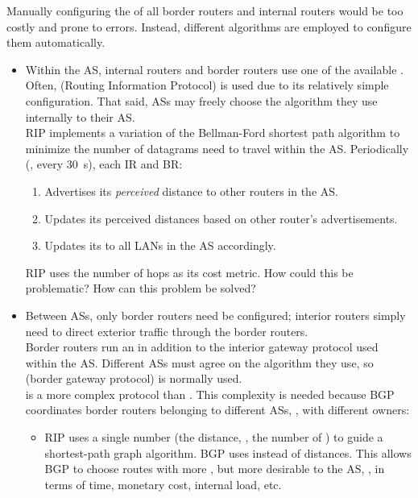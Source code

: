 Manually configuring the  of all border routers and internal routers
would be too costly and prone to errors. Instead, different algorithms are employed to configure them automatically.
\begin{itemize}
\item Within the AS, internal routers and border routers use one of the available 
.
Often,  (Routing Information Protocol) is used due to its relatively simple configuration.
That said, ASs may freely choose the algorithm they use internally to their AS.\\[-0.2cm]

RIP implements a variation of the Bellman-Ford shortest path algorithm to minimize the number of 
datagrams need to travel within the AS. Periodically (\eg, every $30$~s), each IR and BR:\\[-0.4cm]
% 
  \begin{enumerate}
  \item Advertises its \textit{perceived} distance to other routers in the AS.
  \item Updates its perceived distances based on other router's advertisements.
  \item Updates its  to all LANs in the AS accordingly.
  \end{enumerate}

\begin{exercise}
RIP uses the number of hops as its cost metric.
% 
How could this be problematic?
% 
How can this problem be solved?
\end{exercise}

\vspace{0.25cm}
\item Between ASs, only border routers need be configured; interior routers simply need to direct 
exterior traffic through the border routers. \\[-0.3cm]

Border routers run an  in addition to the 
interior gateway protocol used within the AS. Different ASs must agree on the 
algorithm they use, so  (border gateway protocol) is normally used.\\[-0.3cm]

 is a more complex protocol than . This complexity 
is needed because BGP coordinates border routers belonging to different ASs, \ie, 
with different owners:\\[-0.4cm]
\begin{itemize}
\item RIP uses a single number (the distance, \ie, the number of )
to guide a shortest-path graph algorithm. BGP uses  instead of distances.
This allows BGP to choose routes with more , but more desirable to the AS,
\eg, in terms of time, monetary cost, internal load, etc.\\[-0.4cm]


\end{itemize}
\end{itemize}
